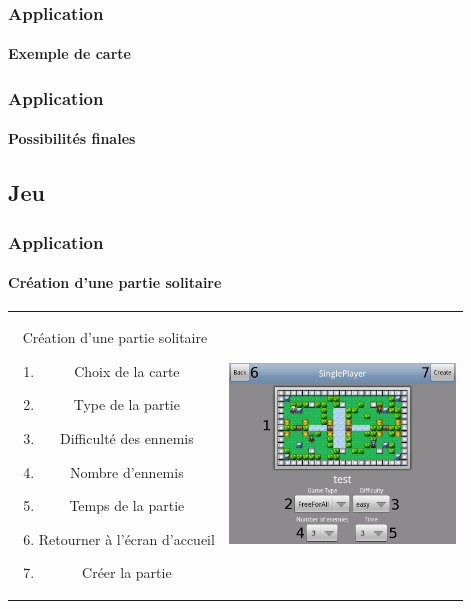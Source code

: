 	\begin{frame}
	\frametitle{Application}
	\framesubtitle{Exemple de carte}
	
	\end{frame}
	
	\begin{frame}
	\frametitle{Application}
	\framesubtitle{Possibilités finales}
	
	\end{frame}

\subsection{Jeu}
	
	\begin{frame}
	\frametitle{Application}
	\framesubtitle{Création d'une partie solitaire}
	
		\begin{tabular}{cc}
			\begin{minipage}{5cm}
				Création d'une partie solitaire
				\begin{enumerate}
					\item Choix de la carte
					\item Type de la partie
					\item Difficulté des ennemis
					\item Nombre d'ennemis
					\item Temps de la partie
					\item Retourner à l'écran d'accueil
					\item Créer la partie
				\end{enumerate}
			\end{minipage} &
			\begin{minipage}{7cm}
				\includegraphics[width=6cm]{img/singleplayerbis.png} 
			\end{minipage}\\
		\end{tabular}
	
	\end{frame}
	

